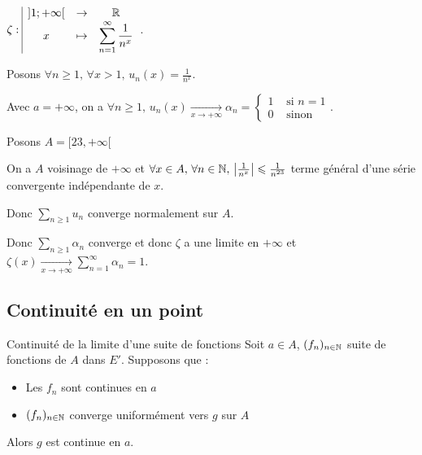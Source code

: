 \begin{exemple}
    $\zeta: \space \begin{array}{|ccc} \displaystyle ]1; +\infty[ & \to & \displaystyle \mathbb{R} \\ \displaystyle x & \mapsto & \displaystyle \sum_{n = 1}^{\infty} \frac 1 {n^x} \end{array}$.

    Posons $\forall n \geqslant 1, \, \forall x > 1, \, u_n(x) = \frac 1 {n^x}$.

    Avec $a = + \infty$, on a $\forall n \geqslant 1, \, u_n(x) \xrightarrow[x \to +\infty]{} \alpha_n = \left\{\begin{array}{cc} 1 & \text{ si } n = 1 \\ 0 & \text{ sinon } \end{array} \right.$.
        
    Posons $A = [23, + \infty[$

    On a $A$ voisinage de $+ \infty$ et $\forall x \in A, \, \forall n \in \mathbb{N}, \, \left| \frac{1}{n^x} \right| \leqslant \frac 1 {n^{23}}$ 
    terme général d'une série convergente indépendante de $x$.

    Donc $\displaystyle \sum_{n \geqslant 1} u_n$ converge normalement sur $A$. 

    Donc $\displaystyle \sum_{n \geqslant 1} \alpha_n$ converge et donc $\zeta$ a une limite en $+ \infty$ et 
    $\zeta(x) \xrightarrow[x \to +\infty]{} \sum_{n = 1 }^{\infty } \alpha_n = 1$.

\end{exemple}

\subsection{Continuité en un point }

\begin{proposition}{Continuité de la limite d'une suite de fonctions}{}
    Soit $a \in A$, $(f_n)_{n \in \mathbb{N}}$ suite de fonctions de $A$ dans $E'$. Supposons que : 
    \begin{itemize}
        \item Les $f_n$ sont continues en $a$
        \item $(f_n)_{n \in \mathbb{N}}$ converge uniformément vers $g$ sur $A$
    \end{itemize}
    Alors $g$ est continue en $a$.
\end{proposition}


